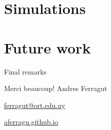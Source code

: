 \documentclass[aspectratio=169]{beamer}
\begin{document}
\section{Simulations}


\section{Future work}

\begin{frame}{Final remarks}
	
\end{frame}


\begin{frame}[plain]
	\vfill
	{\Huge \alert{Merci beaucoup!}}
	\vfill
	Andres Ferragut

	\smallskip

	\href{mailto://ferragut@ort.edu.uy}{\alert{ferragut@ort.edu.uy}}
	
	\smallskip

	\href{http://aferragu.github.io}{\alert{aferragu.github.io}}
\end{frame}
\end{document}
